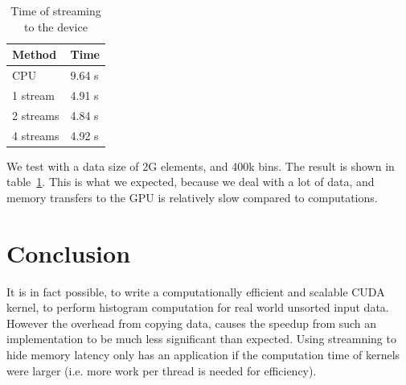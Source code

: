 \documentclass[12pt, a4paper, hidelinks]{article}
\begin{document}
\begin{table}[htpb]
    \centering
    \begin{tabular}{l l}
        Method & Time \\
        \hline
        CPU & 9.64 s \\
        1 stream  & 4.91 s \\
        2 streams & 4.84 s \\
        4 streams & 4.92 s \\
        \hline
    \end{tabular}
    \caption{Time of streaming to the device}
    \label{tab:stream}
\end{table}

We test with a data size of 2G elements, and 400k bins. The result is shown in table~\ref{tab:stream}.
This is what we expected, because we deal with a lot of data, and memory transfers to the GPU is
relatively slow compared to computations.

\section{Conclusion}
It is in fact possible, to write a computationally efficient and scalable CUDA kernel,
to perform histogram computation for real world unsorted input data.
However the overhead from copying data,
causes the speedup from such an implementation to be much less significant than expected. Using streamning to hide memory latency only has an application if the computation time of kernels were larger (i.e. more work per thread is needed for efficiency).


\end{document}
